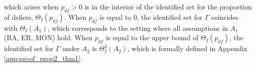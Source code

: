 \documentclass[12pt]{article}
\theoremstyle{plain}
\theoremstyle{definition}
\theoremstyle{remark}
\begin{document}
which arises when $p_{df}>0$ is in the interior of the identified set for the proportion of defiers, $\Theta_I(p_{df})$. When $p_{df}$ is equal to 0, the identified set for $\Gamma$ coincides with $\Theta_I(A_1)$, which corresponds to the setting where all assumptions in $A_1$ (RA, ER, MON) hold. When $p_{df}$ is equal to the upper bound of $\Theta_I(p_{df})$, the identified set for $\Gamma$ under $A_2$ is $\Theta_I^3(A_2)$, which is formally defined in Appendix \ref{app:proof_prop2_thm1}.


\end{document}
